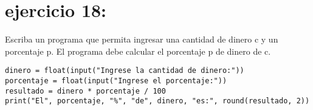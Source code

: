 \documentclass[11pt]{article}
\begin{document}
\section{ejercicio 18:}
\label{sec:org26e174f}
Escriba un programa que permita ingresar una cantidad de
dinero c y un porcentaje p. El programa debe calcular el porcentaje p
de dinero de c.
\begin{verbatim}
dinero = float(input("Ingrese la cantidad de dinero:"))
porcentaje = float(input("Ingrese el porcentaje:"))
resultado = dinero * porcentaje / 100
print("El", porcentaje, "%", "de", dinero, "es:", round(resultado, 2))
\end{verbatim}
\end{document}
